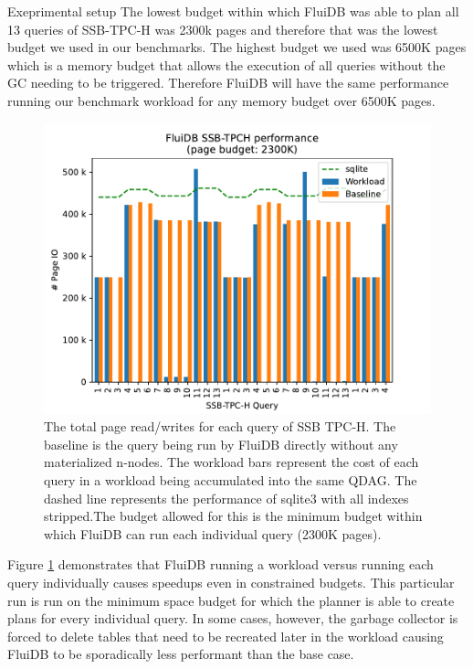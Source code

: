 \begin{corrected}{Exeprimental setup}
  The lowest budget within which FluiDB was able to plan all 13
  queries of SSB-TPC-H was 2300k pages and therefore that was the
  lowest budget we used in our benchmarks. The highest budget we used
  was 6500K pages which is a memory budget that allows the execution
  of all queries without the GC needing to be triggered. Therefore
  FluiDB will have the same performance running our benchmark workload
  for any memory budget over 6500K pages.
\end{corrected}


\newcommand{\ioperfdescr}{The total page read/writes for each query of
  SSB TPC-H. The baseline is the query being run by FluiDB directly
  without any materialized n-nodes. The workload bars represent the
  cost of each query in a workload being accumulated into the same
  QDAG. The dashed line represents the performance of sqlite3 with all
  indexes stripped.}
\begin{figure}[H]
  \centering
  \includegraphics[width=.9\linewidth]{./plans/workload_2300K.pdf}
  \caption{\label{fig:min_budget_plot} \ioperfdescr The budget allowed
    for this is the minimum budget within which FluiDB can run each
    individual query (2300K pages).}
\end{figure}

Figure \ref{fig:min_budget_plot} demonstrates that FluiDB running a
workload versus running each query individually causes speedups even
in constrained budgets. This particular run is run on the minimum
space budget for which the planner is able to create plans for every
individual query. In some cases, however, the garbage collector is
forced to delete tables that need to be recreated later in the
workload causing FluiDB to be sporadically less performant than the
base case.

